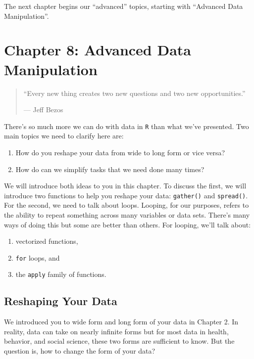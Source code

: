 \documentclass[]{tufte-book}
\providecommand{\tightlist}{%
  \setlength{\itemsep}{0pt}\setlength{\parskip}{0pt}}
\theoremstyle{definition}
\theoremstyle{definition}
\theoremstyle{remark}
\begin{document}
The next chapter begins our ``advanced'' topics, starting with
``Advanced Data Manipulation''.

\chapter*{Chapter 8: Advanced Data
Manipulation}\label{chapter-8-advanced-data-manipulation}

\begin{quote}
``Every new thing creates two new questions and two new opportunities.''

--- Jeff Bezos
\end{quote}

There's so much more we can do with data in \texttt{R} than what we've
presented. Two main topics we need to clarify here are:

\begin{enumerate}
\def\labelenumi{\arabic{enumi}.}
\tightlist
\item
  How do you reshape your data from wide to long form or vice versa?
\item
  How do can we simplify tasks that we need done many times?
\end{enumerate}

We will introduce both ideas to you in this chapter. To discuss the
first, we will introduce two functions to help you reshape your data:
\texttt{gather()} and \texttt{spread()}. For the second, we need to talk
about loops. Looping, for our purposes, refers to the ability to repeat
something across many variables or data sets. There's many ways of doing
this but some are better than others. For looping, we'll talk about:

\begin{enumerate}
\def\labelenumi{\arabic{enumi}.}
\tightlist
\item
  vectorized functions,
\item
  \texttt{for} loops, and
\item
  the \texttt{apply} family of functions.
\end{enumerate}

\section*{Reshaping Your Data}\label{reshaping-your-data}

We introduced you to wide form and long form of your data in Chapter 2.
In reality, data can take on nearly infinite forms but for most data in
health, behavior, and social science, these two forms are sufficient to
know. But the question is, how to change the form of your data?
\end{document}
